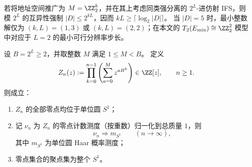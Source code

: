 \begin{remark}[强分离资源的离散门槛]\label{rem:conclusion-godel-leyang-five-digit-quantization}
若将地址空间推广为 \(M=\ZZ_2^k\)，并在其上考虑同类强分离的 \(2^L\)-进仿射 IFS，则模 \(2^L\) 的互异性强制 \(|D|\le 2^{kL}\)，因而 \(kL\ge \lceil \log_2|D|\rceil\)。
当 \(|D|=5\) 时，最小整数解仅为 \((k,L)=(1,3)\) 或 \((k,L)=(2,2)\)；在本文的 \(T_2(E_{\min})\cong\ZZ_2^2\) 模型中对应于 \(L=2\) 的最小可行分辨率步长。
\end{remark}

\begin{theorem}\label{thm:conclusion-godel-leyang-resolution-tower-circle-law}
设 \(B=2^L\ge 2\)，并取整数 \(M\) 满足 \(1\le M<B\)。
定义
\begin{equation}\label{eq:conclusion-godel-leyang-resolution-partition-poly}
Z_n(z):=\prod_{k=0}^{n-1}\left(\sum_{a=0}^{M}z^{aB^k}\right)\in\ZZ[z],\qquad n\ge 1.
\end{equation}
则成立：
\begin{enumerate}
  \item \(Z_n\) 的全部零点均位于单位圆 \(S^1\)；
  \item 记 \(\nu_n\) 为 \(Z_n\) 的零点计数测度（按重数）归一化到总质量 \(1\)，则
  \begin{equation}\label{eq:conclusion-godel-leyang-zeros-weak-limit}
  \nu_n\Longrightarrow m_{S^1}\qquad(n\to\infty),
  \end{equation}
  其中 \(m_{S^1}\) 为单位圆 Haar 概率测度；
  \item 零点集合的聚点集为整个 \(S^1\)。
\end{enumerate}
\end{theorem}
